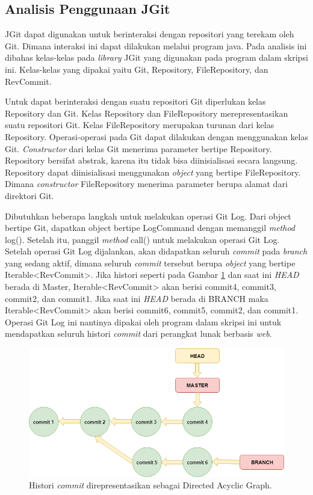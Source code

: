\subsection{Analisis Penggunaan JGit}
\label{subsec:analisis_jgit}
JGit dapat digunakan untuk berinteraksi dengan repositori yang terekam oleh Git. Dimana interaksi ini dapat dilakukan melalui program java. Pada analisis ini dibahas kelas-kelas pada \textit{library} JGit yang digunakan pada program dalam skripsi ini. Kelas-kelas yang dipakai yaitu Git, Repository, FileRepository, dan RevCommit.

Untuk dapat berinteraksi dengan suatu repositori Git diperlukan kelas Repository dan Git. Kelas Repository dan FileRepository merepresentasikan suatu repositori Git. Kelas FileRepository merupakan turunan dari kelas Repository. Operasi-operasi pada Git dapat dilakukan dengan menggunakan kelas Git. \textit{Constructor} dari kelas Git menerima parameter bertipe Repository. Repository bersifat abstrak, karena itu tidak bisa diinisialisasi secara langsung. Repository dapat diinisialisasi menggunakan \textit{object} yang bertipe FileRepository. Dimana \textit{constructor} FileRepository menerima parameter berupa alamat dari direktori Git. 

Dibutuhkan beberapa langkah untuk melakukan operasi Git Log. Dari object bertipe Git, dapatkan object bertipe LogCommand dengan memanggil \textit{method} log(). Setelah itu, panggil \textit{method} call() untuk melakukan operasi Git Log. Setelah operasi Git Log dijalankan, akan didapatkan seluruh \textit{commit} pada \textit{branch} yang sedang aktif, dimana seluruh \textit{commit} tersebut berupa \textit{object} yang bertipe Iterable<RevCommit>. Jika histori seperti pada Gambar \ref{fig:DAG} dan saat ini \textit{HEAD} berada di Master, Iterable<RevCommit> akan berisi commit4, commit3, commit2, dan commit1. Jika saat ini \textit{HEAD} berada di BRANCH maka Iterable<RevCommit> akan berisi commit6, commit5, commit2, dan commit1. Operasi Git Log ini nantinya dipakai oleh program dalam skripsi ini untuk mendapatkan seluruh histori \textit{commit} dari perangkat lunak berbasis \textit{web}.

\begin{figure}[H]
	\centering
		\includegraphics[scale=0.6]{Gambar/DAG.png}
	\caption{Histori \textit{commit} direpresentasikan sebagai Directed Acyclic Graph.}
	\label{fig:DAG}
\end{figure}

